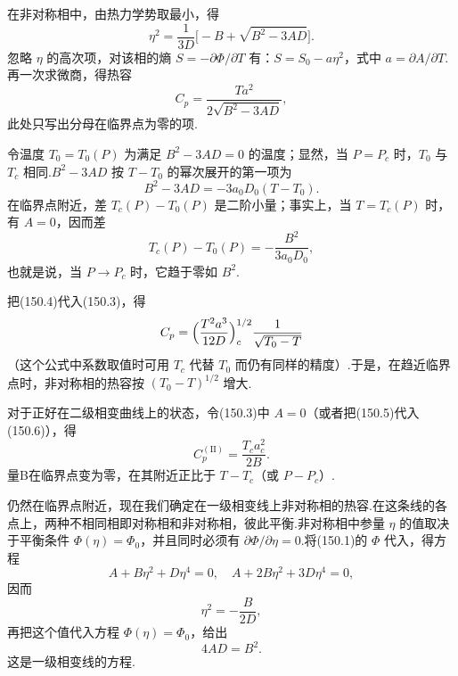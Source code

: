 在非对称相中，由热力学势取最小，得
\begin{equation}
  \eta^2=\frac{1}{3D}\bigl[-B+\sqrt{B^2-3AD}\bigr].
\end{equation}
忽略 $\eta$ 的高次项，对该相的熵 $S=-\partial\Phi/\partial T$ 有：$S=S_0-a\eta^2$，式中 $a=\partial A/\partial T$.再一次求微商，得热容
\begin{equation}
  C_p=\frac{Ta^2}{2\sqrt{B^2-3AD}},
\end{equation}
此处只写出分母在临界点为零的项.

令温度 $T_0=T_0(P)$ 为满足 $B^2-3AD=0$ 的温度；显然，当 $P=P_c$ 时，$T_0$ 与 $T_c$ 相同.$B^2-3AD$ 按 $T-T_0$ 的幂次展开的第一项为
\begin{equation}
  B^2-3AD=-3a_0D_0(T-T_0).
\end{equation}
在临界点附近，差 $T_c(P)-T_0(P)$ 是二阶小量；事实上，当 $T=T_c(P)$ 时，有 $A=0$，因而差
\begin{equation}
  T_c(P)-T_0(P)=-\frac{B^2}{3a_0D_0},
\end{equation}
也就是说，当 $P\to P_c$ 时，它趋于零如 $B^2$.

把(150.4)代入(150.3)，得
\begin{equation}
  C_p=\Bigl(\frac{T^2a^3}{12D}\Bigr)_c^{1/2}
  \frac{1}{\sqrt{T_0-T}}
\end{equation}
（这个公式中系数取值时可用 $T_c$ 代替 $T_0$ 而仍有同样的精度）.于是，在趋近临界点时，非对称相的热容按 $(T_0-T)^{1/2}$ 增大.

对于正好在二级相变曲线上的状态，令(150.3)中 $A=0$（或者把(150.5)代入(150.6)），得
\begin{equation}
  C_p^{(\mathrm{II})}=\frac{T_ca_c^2}{2B}.
\end{equation}
量B在临界点变为零，在其附近正比于 $T-T_c$（或 $P-P_c$）.

仍然在临界点附近，现在我们确定在一级相变线上非对称相的热容.在这条线的各点上，两种不相同相即对称相和非对称相，彼此平衡.非对称相中参量 $\eta$ 的值取决于平衡条件 $\Phi(\eta)=\Phi_0$，并且同时必须有 $\partial\Phi/\partial\eta=0$.将(150.1)的 $\Phi$ 代入，得方程
\begin{equation*}
  A+B\eta^2+D\eta^4=0,\quad A+2B\eta^2+3D\eta^4=0,
\end{equation*}
因而
\begin{equation}
  \eta^2=-\frac{B}{2D},
\end{equation}
再把这个值代入方程 $\Phi(\eta)=\Phi_0$，给出
\begin{equation}
  4AD=B^2.
\end{equation}
这是一级相变线的方程.

